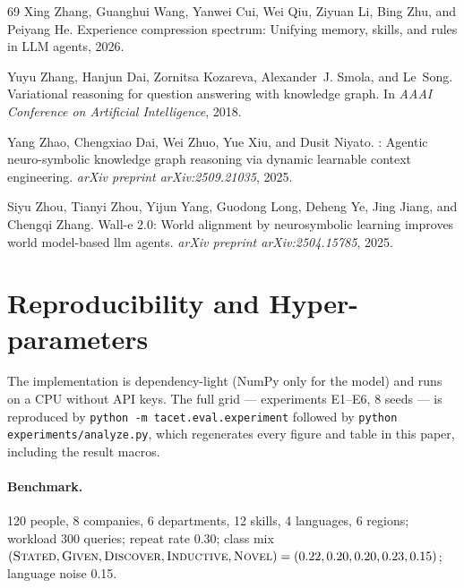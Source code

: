\documentclass[11pt]{article}
\theoremstyle{plain}
\newcommand{\seeds}{8}
\renewcommand{\seeds}{8}
\begin{document}
{\begin{thebibliography}{69}
Xing Zhang, Guanghui Wang, Yanwei Cui, Wei Qiu, Ziyuan Li, Bing Zhu, and
  Peiyang He.
\newblock Experience compression spectrum: Unifying memory, skills, and rules
  in {LLM} agents, 2026.

Yuyu Zhang, Hanjun Dai, Zornitsa Kozareva, Alexander~J. Smola, and Le~Song.
\newblock Variational reasoning for question answering with knowledge graph.
\newblock In \emph{AAAI Conference on Artificial Intelligence}, 2018.

Yang Zhao, Chengxiao Dai, Wei Zhuo, Yue Xiu, and Dusit Niyato.
: Agentic neuro-symbolic knowledge graph reasoning via
  dynamic learnable context engineering.
\newblock \emph{arXiv preprint arXiv:2509.21035}, 2025.

Siyu Zhou, Tianyi Zhou, Yijun Yang, Guodong Long, Deheng Ye, Jing Jiang, and
  Chengqi Zhang.
\newblock Wall-e 2.0: World alignment by neurosymbolic learning improves world
  model-based llm agents.
\newblock \emph{arXiv preprint arXiv:2504.15785}, 2025.

\end{thebibliography}
}

\appendix
\section{Reproducibility and Hyper-parameters}

The implementation is dependency-light (NumPy only for the model) and runs
on a CPU without API keys. The full grid --- experiments E1--E6, \seeds{}
seeds --- is reproduced by
\texttt{python -m tacet.eval.experiment} followed by
\texttt{python experiments/analyze.py}, which regenerates every figure and
table in this paper, including the result macros.

\paragraph{Benchmark.} 120 people, 8 companies, 6 departments, 12 skills,
4 languages, 6 regions; workload 300 queries; repeat rate 0.30; class mix
$(\textsc{Stated},\textsc{Given},\textsc{Discover},\textsc{Inductive},
\textsc{Novel})=(0.22,0.20,0.20,0.23,0.15)$; language noise 0.15.
\end{document}

